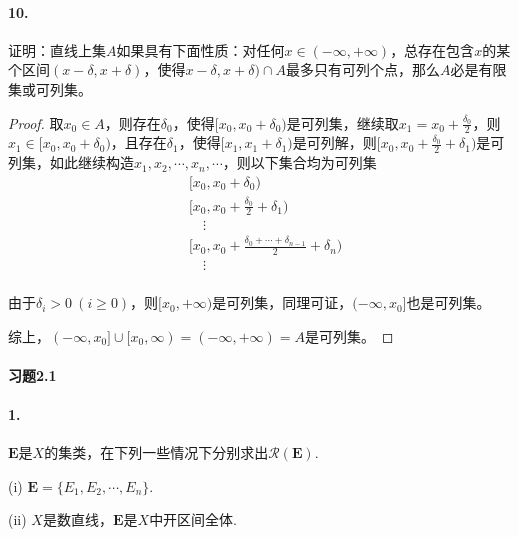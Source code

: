 \documentclass[12pt, a4paper, oneside]{ctexart}
\begin{document}
\paragraph{10.}证明：直线上集$A$如果具有下面性质：对任何$x\in(-\infty,+\infty)$，总存在包含$x$的某个区间$(x-\delta,x+\delta)$，使得$x-\delta,x+\delta)\cap A$最多只有可列个点，那么$A$必是有限集或可列集。
\begin{proof}
    取$x_0\in A$，则存在$\delta_0$，使得$[x_0, x_0+\delta_0)$是可列集，继续取$x_1 = x_0+\frac{\delta_0}{2}$，则$x_1\in [x_0,x_0+\delta_0)$，且存在$\delta_1$，使得$[x_1,x_1+\delta_1)$是可列解，则$[x_0, x_0+\frac{\delta_0}{2}+\delta_1)$是可列集，如此继续构造$x_1,x_2,\cdots,x_n,\cdots$，则以下集合均为可列集
    \begin{equation*}
        \begin{aligned}
            &[x_0,x_0+\delta_0)\\
            &[x_0,x_0+\frac{\delta_0}{2}+\delta_1)\\
            &\quad\vdots\\
            &[x_0,x_0+\frac{\delta_0+\cdots+\delta_{n-1}}{2}+\delta_n)\\
            &\quad\vdots\\
        \end{aligned}
    \end{equation*}

    由于$\delta_i>0\ (i\geqslant 0)$，则$[x_0,+\infty)$是可列集，同理可证，$(-\infty, x_0]$也是可列集。

    综上，$(-\infty,x_0]\cup[x_0,\infty) = (-\infty,+\infty)=A$是可列集。
\end{proof}

\paragraph{习题2.1}
\paragraph{1.}$\mathbf{E}$是$X$的集类，在下列一些情况下分别求出$\mathcal{R}(\mathbf{E})$.

(i) $\mathbf{E}=\{E_1,E_2,\cdots,E_n\}$.

(ii) $X$是数直线，$\mathbf{E}$是$X$中开区间全体.
\end{document}
